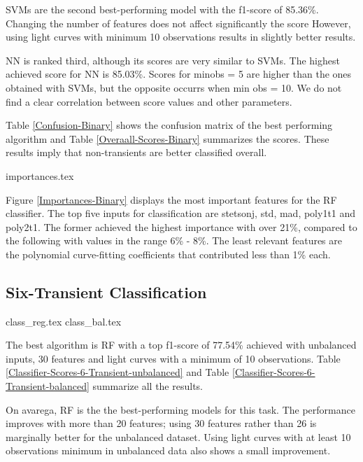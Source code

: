 \documentclass[a4paper,fleqn,usenatbib]{mnras}
\begin{document}
SVMs are the second best-performing model with the  f1-score of 85.36\%. 
Changing the number of features does not affect significantly the score
However, using light curves with minimum 10 observations results in
slightly better results. 

NN is ranked third, although its scores are very similar to SVMs. 
The highest achieved score for NN is 85.03\%.
Scores for min\textunderscore obs = 5 are higher than the ones
obtained with SVMs, but the opposite occurrs when min\textunderscore
obs = 10.  
We do not find a clear correlation between score values and other
parameters.  

Table \ref{Confusion-Binary} shows the confusion matrix of the best
performing algorithm and Table \ref{Overaall-Scores-Binary} summarizes
the scores.
These results imply that non-transients are better classified overall.  


{importances.tex}

Figure \ref{Importances-Binary} displays the most important features
for the RF classifier.
The top five inputs for classification are stetson\textunderscore j,
std, mad, poly1\textunderscore t1 and poly2\textunderscore t1.  
The former achieved the highest importance with over 21\%, compared to
the following with values in the range 6\% - 8\%. 
The least relevant features are the polynomial curve-fitting
coefficients that contributed less than 1\% each.


\subsection{Six-Transient Classification}

{class_reg.tex}
{class_bal.tex}

The best algorithm is RF with a top f1-score of 77.54\% achieved with 
unbalanced inputs, 30 features and light curves with a minimum of 10
observations. 
Table \ref{Classifier-Scores-6-Transient-unbalanced} and Table
\ref{Classifier-Scores-6-Transient-balanced} summarize all the
results. 
 
On avarega, RF is the the best-performing models for this
task. 
The performance improves with more than 20 features; using 30 features rather than 26
is marginally better for the unbalanced dataset. 
Using light curves with at least 10 observations minimum
in unbalanced data also shows a small improvement.
\end{document}
